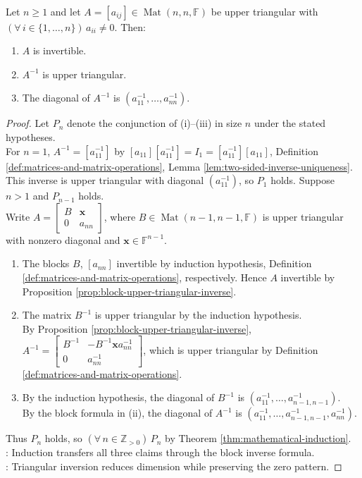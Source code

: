 \begin{theorem} \label{thm:inverse-upper-triangular} \\
Let $n\geq1$ and let $A=[a_{ij}]\in\operatorname{Mat}(n,n,\mathbb{F})$ be upper triangular with $(\forall\,i\in\{1,\ldots,n\})\,a_{ii}\neq0$. Then:
\begin{enumerate}[label=(\roman*)]
\setlength{\itemsep}{0pt}
\item $A$ is invertible.
\item $A^{-1}$ is upper triangular.
\item The diagonal of $A^{-1}$ is $(a_{11}^{-1},\ldots,a_{nn}^{-1})$.
\end{enumerate}
\begin{proof}
Let $P_n$ denote the conjunction of (i)--(iii) in size $n$ under the stated hypotheses.\\
For $n=1$, $A^{-1}=[a_{11}^{-1}]$ by $[a_{11}][a_{11}^{-1}]=I_1=[a_{11}^{-1}][a_{11}]$, Definition \ref{def:matrices-and-matrix-operations}, Lemma \ref{lem:two-sided-inverse-uniqueness}.\\
This inverse is upper triangular with diagonal $(a_{11}^{-1})$, so $P_1$ holds. Suppose $n>1$ and $P_{n-1}$ holds.\\
Write $A=\left[\begin{smallmatrix}B&\mathbf{x}\\0&a_{nn}\end{smallmatrix}\right]$, where $B\in\operatorname{Mat}(n-1,n-1,\mathbb{F})$ is upper triangular with nonzero diagonal and $\mathbf{x}\in\mathbb{F}^{n-1}$.
\begin{enumerate}[label=(\roman*)]
\setlength{\itemsep}{0pt}
\item The blocks $B$, $[a_{nn}]$ invertible by induction hypothesis, Definition \ref{def:matrices-and-matrix-operations}, respectively. Hence $A$ invertible by Proposition \ref{prop:block-upper-triangular-inverse}.
\item The matrix $B^{-1}$ is upper triangular by the induction hypothesis.\\
By Proposition \ref{prop:block-upper-triangular-inverse}, $A^{-1}=\left[\begin{smallmatrix}B^{-1}&-B^{-1}\mathbf{x}a_{nn}^{-1}\\0&a_{nn}^{-1}\end{smallmatrix}\right]$, which is upper triangular by Definition \ref{def:matrices-and-matrix-operations}.
\item By the induction hypothesis, the diagonal of $B^{-1}$ is $(a_{11}^{-1},\ldots,a_{n-1,n-1}^{-1})$.\\
By the block formula in (ii), the diagonal of $A^{-1}$ is $(a_{11}^{-1},\ldots,a_{n-1,n-1}^{-1},a_{nn}^{-1})$.
\end{enumerate}
Thus $P_n$ holds, so $(\forall\,n\in\mathbb{Z}_{>0})\,P_n$ by Theorem \ref{thm:mathematical-induction}.\\
: Induction transfers all three claims through the block inverse formula.\\
: Triangular inversion reduces dimension while preserving the zero pattern.
\end{proof}
\end{theorem}
